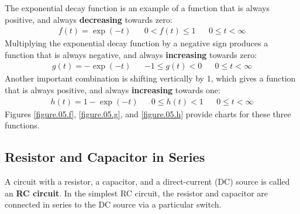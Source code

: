 The exponential decay function is an example of a function that is always positive, and always \textbf{decreasing} towards zero:
\begin{align}
    f(t) = \exp(-t) && 0 < f(t) \leq 1 && 0 \leq t < \infty
\end{align}
Multiplying the exponential decay function by a negative sign produces a function that is always negative, and always \textbf{increasing} towards zero:
\begin{align}
    g(t) = -\exp(-t) && -1 \leq g(t) < 0 && 0 \leq t < \infty
\end{align}
Another important combination is shifting vertically by 1, which gives a function that is always positive, and always \textbf{increasing} towards one:
\begin{align}
    h(t) = 1 - \exp(-t) && 0 \leq h(t) < 1 && 0 \leq t < \infty
\end{align}
Figures \ref{figure.05.f}, \ref{figure.05.g}, and \ref{figure.05.h} provide charts for these three functions.
\subsection{Resistor and Capacitor in Series}
A circuit with a resistor, a capacitor, and a direct-current (DC) source is called an \textbf{RC circuit}. In the simplest RC circuit, the resistor and capacitor are connected in series to the DC source via a particular switch.
